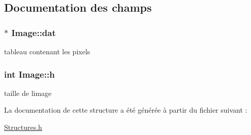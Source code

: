 \subsection{Documentation des champs}
\subsubsection[{\texorpdfstring{dat}{dat}}]{$\ast$ Image\+::dat}\hypertarget{structImage_abc032a260e391b03f825917716eb07b7}{}\label{structImage_abc032a260e391b03f825917716eb07b7}
tableau contenant les pixels 
\subsubsection[{\texorpdfstring{h}{h}}]{\setlength{\rightskip}{0pt plus 5cm}int Image\+::h}\hypertarget{structImage_aead13dbc461159381773fff06824e651}{}\label{structImage_aead13dbc461159381773fff06824e651}
taille de l\textquotesingle{}image 

La documentation de cette structure a été générée à partir du fichier suivant \+:\begin{DoxyCompactItemize}
\item 
\hyperlink{Structures_8h}{Structures.\+h}\end{DoxyCompactItemize}
